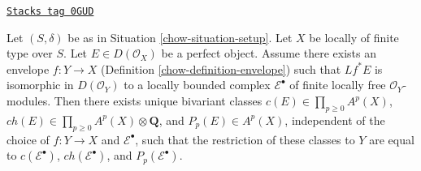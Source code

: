 \begin{lemma}
\label{chow-lemma-defined-by-envelope}
\href{https://stacks.math.columbia.edu/tag/0GUD}{\texttt{Stacks tag 0GUD}}

Let $(S, \delta)$ be as in Situation \ref{chow-situation-setup}.
Let $X$ be locally of finite type over $S$. Let $E \in D(\mathcal{O}_X)$
be a perfect object. Assume there exists an envelope
$f : Y \to X$ (Definition \ref{chow-definition-envelope})
such that $Lf^*E$ is isomorphic in $D(\mathcal{O}_Y)$
to a locally bounded complex $\mathcal{E}^\bullet$ of finite locally free
$\mathcal{O}_Y$-modules. Then there exists unique bivariant classes
$c(E) \in \prod_{p \geq 0} A^p(X)$,
$ch(E) \in \prod_{p \geq 0} A^p(X) \otimes \mathbf{Q}$, and
$P_p(E) \in A^p(X)$, independent of the choice of $f : Y \to X$
and $\mathcal{E}^\bullet$, such that the restriction of these classes
to $Y$ are equal to $c(\mathcal{E}^\bullet)$,
$ch(\mathcal{E}^\bullet)$, and $P_p(\mathcal{E}^\bullet)$.
\end{lemma}


